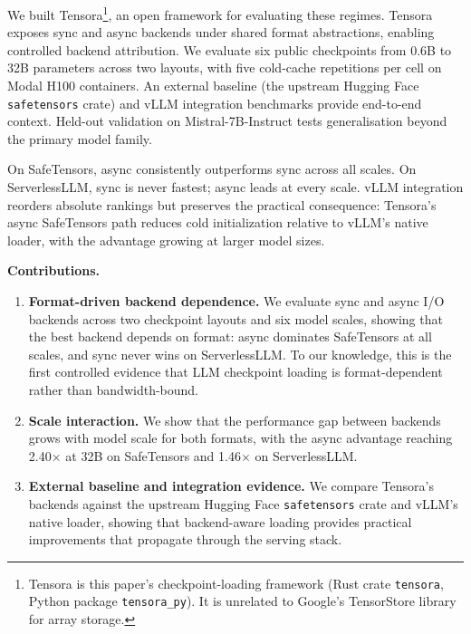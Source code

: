 We built Tensora\footnote{Tensora is this paper's checkpoint-loading framework (Rust crate \texttt{tensora}, Python package \texttt{tensora\_py}). It is unrelated to Google's TensorStore library for array storage.}, an open framework for evaluating these regimes. Tensora exposes sync and async backends under shared format abstractions, enabling controlled backend attribution. We evaluate six public checkpoints from 0.6B to 32B parameters across two layouts, with five cold-cache repetitions per cell on Modal H100 containers. An external baseline (the upstream Hugging Face \texttt{safetensors} crate) and vLLM integration benchmarks provide end-to-end context. Held-out validation on Mistral-7B-Instruct tests generalisation beyond the primary model family.

On SafeTensors, async consistently outperforms sync across all scales. On ServerlessLLM, sync is never fastest; async leads at every scale. vLLM integration reorders absolute rankings but preserves the practical consequence: Tensora's async SafeTensors path reduces cold initialization relative to vLLM's native loader, with the advantage growing at larger model sizes.

\textbf{Contributions.}
\begin{enumerate}
  \item \textbf{Format-driven backend dependence.} We evaluate sync and async I/O backends across two checkpoint layouts and six model scales, showing that the best backend depends on format: async dominates SafeTensors at all scales, and sync never wins on ServerlessLLM. To our knowledge, this is the first controlled evidence that LLM checkpoint loading is format-dependent rather than bandwidth-bound.
  \item \textbf{Scale interaction.} We show that the performance gap between backends grows with model scale for both formats, with the async advantage reaching 2.40$\times$ at 32B on SafeTensors and 1.46$\times$ on ServerlessLLM.
  \item \textbf{External baseline and integration evidence.} We compare Tensora's backends against the upstream Hugging Face \texttt{safetensors} crate and vLLM's native loader, showing that backend-aware loading provides practical improvements that propagate through the serving stack.
\end{enumerate}
